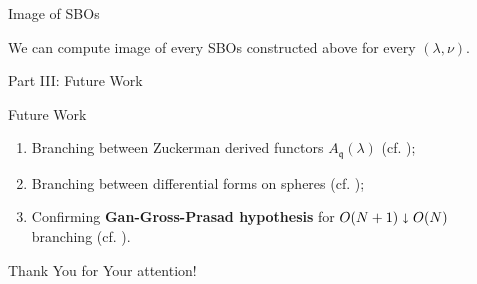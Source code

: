 \documentclass[pdf]{beamer}
\theoremstyle{mystyle}
\theoremstyle{remark}
\begin{document}
\begin{frame}{Image of SBOs}
	\begin{theorem}
		We can compute image of every SBOs constructed above for every $(\lambda,\nu)$.
	\end{theorem}
\end{frame}
\begin{frame}{}
	\begin{center}
		\huge Part III: Future Work
	\end{center}
\end{frame}
\begin{frame}{Future Work}
	\begin{enumerate}
		\item Branching between Zuckerman derived functors $A_{\mathfrak{q}}(\lambda)$ (cf. \cite{KO1,kobayashi1998discrete3});
		\item Branching between differential forms on spheres (cf. \cite{kobayashi2016classification,kobayashi2017symmetry});
		\item Confirming {\bf Gan-Gross-Prasad hypothesis} for $O(N+1)\shortdownarrow O(N)$ branching (cf. \cite{kobayashi2017symmetry}).
	\end{enumerate}
\end{frame}
\begin{frame}{}
	\begin{center}
		\huge Thank You for Your attention!
	\end{center}
\end{frame}
\end{document}
